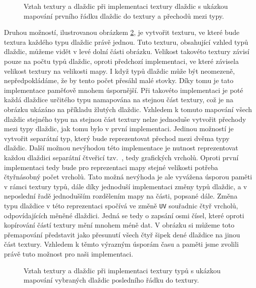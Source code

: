 \begin{figure}[h]
	\centering
	
	\caption{Vztah textury a dlaždic při implementaci textury dlaždic s ukázkou mapování prvního řádku dlaždic do textury a přechodů mezi typy.}
	\label{fig:mapbigtexture}
\end{figure}

Druhou možností, ilustrovanou obrázkem \ref{fig:mapsmalltexture}, je vytvořit texturu, ve které bude textura každého typu dlaždic právě jednou. Tuto texturu, obsahující vzhled typů dlaždic, můžeme vidět v levé dolní části obrázku. Velikost takovéto textury závisí pouze na počtu typů dlaždic, oproti předchozí implementaci, ve které závisela velikost textury na velikosti mapy. I když typů dlaždic může být neomezeně, nepředpokládáme, že by tento počet přesáhl malé stovky. Díky tomu je tato implementace paměťově mnohem úspornější. Při takovéto implementaci je poté každá dlaždice určitého typu namapována na stejnou část textury, což je na obrázku ukázáno na příkladu žlutých dlaždic. Vzhledem k tomuto mapování všech dlaždic stejného typu na stejnou část textury nelze jednoduše vytvořit přechody mezi typy dlaždic, jak tomu bylo v první implementaci. Jedinou možností je vytvořit separátní typ, který bude reprezentovat přechod mezi dvěma typy dlaždic. Další možnou nevýhodou této implementace je nutnost reprezentovat každou dlaždici separátní čtveřicí tzv.~, tedy grafických vrcholů. Oproti první implementaci tedy bude pro reprezentaci mapy stejné velikosti potřeba čtyřnásobný počet vrcholů. Tato možná nevýhoda je ale vyvážena úsporou paměti v rámci textury typů, dále díky jednoduší implementaci změny typů dlaždic, a v neposlední řadě jednodušším rozdělením mapy na části, popsané dále. Změna typu dlaždice v této reprezentaci spočívá ve změně \texttt{UV} souřadnic čtyř vrcholů, odpovídajících měněné dlaždici. Jedná se tedy o zapsání osmi čísel, které oproti kopírování částí textury mění mnohem méně dat. V obrázku si můžeme toto přemapování představit jako přesunutí všech čtyř šipek dené dlaždice na jinou část textury. Vzhledem k těmto výrazným úsporám času a paměti jsme zvolili právě tuto možnost pro naši implementaci.

\begin{figure}[h]
	\centering
	
	\caption{Vztah textury a dlaždic při implementaci textury typů s ukázkou mapování vybraných dlaždic posledního řádku do textury.}
	\label{fig:mapsmalltexture}
\end{figure}


